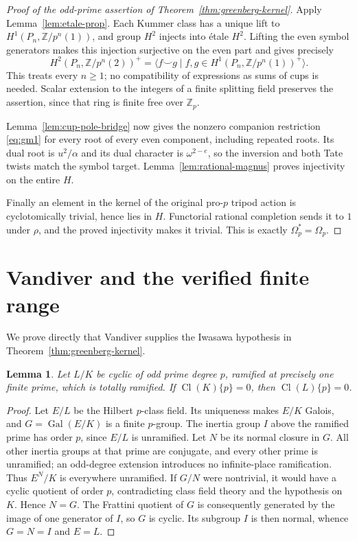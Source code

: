 \documentclass[11pt]{article}
\newtheorem{lemma}[theorem]{Lemma}
\theoremstyle{definition}
\numberwithin{equation}{section}
\begin{document}
\begin{proof}[Proof of the odd-prime assertion of Theorem~\ref{thm:greenberg-kernel}]
Apply Lemma~\ref{lem:etale-prop}. Each Kummer class has a unique
lift to $H^1(P_n,\mathbb Z/p^n(1))$, and group $H^2$ injects into
\'etale $H^2$. Lifting the even symbol generators makes this
injection surjective on the even part and gives precisely
\begin{equation}
 H^2(P_n,\mathbb Z/p^n(2))^+
  =\bigl\langle f\smile g\mid
       f,g\in H^1(P_n,\mathbb Z/p^n(1))^+\bigr\rangle.       \label{eq:gm10}
\end{equation}
This treats every $n\ge1$; no compatibility of expressions as sums
of cups is needed. Scalar extension to the integers of a finite
splitting field preserves the assertion, since that ring is finite
free over $\mathbb Z_p$.

Lemma~\ref{lem:cup-pole-bridge} now gives the nonzero companion
restriction \eqref{eq:gm1} for every root of every even component, including
repeated roots. Its dual root is $u^2/\alpha$ and its dual character
is $\omega^{2-e}$, so the inversion and both Tate twists match
the symbol target. Lemma~\ref{lem:rational-magnus} proves
injectivity on the entire $H$.

Finally an element in the kernel of the original pro-$p$ tripod
action is cyclotomically trivial, hence lies in $H$. Functorial
rational completion sends it to $1$ under $\rho$, and the proved
injectivity makes it trivial. This is exactly
$\Omega_p^*=\Omega_p$.
\end{proof}
\section{Vandiver and the verified finite range}

We prove directly that Vandiver supplies the Iwasawa hypothesis in
Theorem~\ref{thm:greenberg-kernel}.

\begin{lemma}\label{lem:persistence}
Let $L/K$ be cyclic of odd prime degree $p$, ramified at precisely one
finite prime, which is totally ramified. If $\operatorname{Cl}(K)\{p\}=0$,
then $\operatorname{Cl}(L)\{p\}=0$.
\end{lemma}
\begin{proof}
Let $E/L$ be the Hilbert $p$-class field. Its uniqueness makes $E/K$
Galois, and $G=\operatorname{Gal}(E/K)$ is a finite $p$-group. The
inertia group $I$ above the ramified prime has order $p$, since
$E/L$ is unramified. Let $N$ be its normal closure in $G$. All other
inertia groups at that prime are conjugate, and every other prime
is unramified; an odd-degree extension introduces no infinite-place
ramification. Thus $E^N/K$ is everywhere unramified. If $G/N$ were
nontrivial, it would have a cyclic quotient of order $p$, contradicting
class field theory and the hypothesis on $K$. Hence $N=G$.
The Frattini quotient of $G$ is consequently generated by the image
of one generator of $I$, so $G$ is cyclic. Its subgroup $I$ is then
normal, whence $G=N=I$ and $E=L$.
\end{proof}
\end{document}
